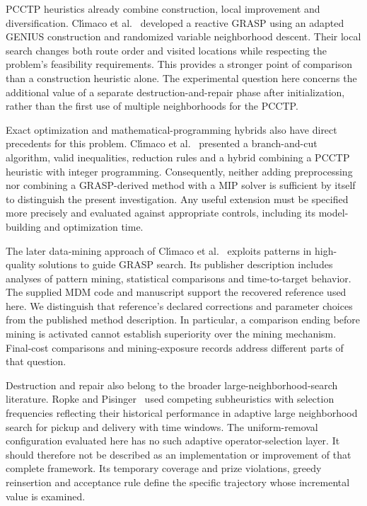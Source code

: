 PCCTP heuristics already combine construction, local improvement and
diversification. Cl\'{\i}maco et al.~\cite{climaco2021reactive} developed a
reactive GRASP using an adapted GENIUS construction and randomized variable
neighborhood descent. Their local search changes both route order and visited
locations while respecting the problem's feasibility requirements. This
provides a stronger point of comparison than a construction heuristic alone.
The experimental question here concerns the additional value of a separate
destruction-and-repair phase after initialization, rather than the first use
of multiple neighborhoods for the PCCTP.

Exact optimization and mathematical-programming hybrids also have direct
precedents for this problem. Cl\'{\i}maco et al.~\cite{climaco2023approaches}
presented a branch-and-cut algorithm, valid inequalities, reduction rules and
a hybrid combining a PCCTP heuristic with integer programming. Consequently,
neither adding preprocessing nor combining a GRASP-derived method with a MIP
solver is sufficient by itself to distinguish the present investigation.
Any useful extension must be specified more precisely and evaluated against
appropriate controls, including its model-building and optimization time.

The later data-mining approach of Cl\'{\i}maco et
al.~\cite{climaco2026mdm} exploits patterns in high-quality solutions to guide
GRASP search. Its publisher description includes analyses of pattern mining,
statistical comparisons and time-to-target behavior. The supplied MDM code
and manuscript support the recovered reference used here. We distinguish
that reference's declared corrections and parameter choices from the
published method description. In particular, a comparison ending before
mining is activated cannot establish superiority over the mining mechanism.
Final-cost comparisons and mining-exposure records address different parts
of that question.

Destruction and repair also belong to the broader large-neighborhood-search
literature. Ropke and Pisinger~\cite{ropke2006alns} used competing
subheuristics with selection frequencies reflecting their historical
performance in adaptive large neighborhood search for pickup and delivery
with time windows. The uniform-removal configuration evaluated here has no
such adaptive operator-selection layer. It should therefore not be described
as an implementation or improvement of that complete framework. Its
temporary coverage and prize violations, greedy reinsertion and acceptance
rule define the specific trajectory whose incremental value is examined.


